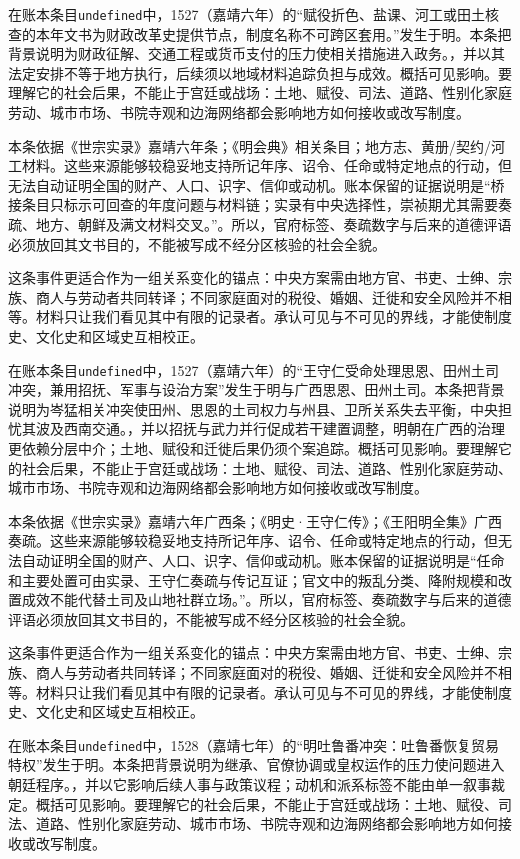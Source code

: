 在账本条目\texttt{undefined}中，1527（嘉靖六年）的“赋役折色、盐课、河工或田土核查的本年文书为财政改革史提供节点，制度名称不可跨区套用。”发生于明。本条把背景说明为财政征解、交通工程或货币支付的压力使相关措施进入政务。，并以其法定安排不等于地方执行，后续须以地域材料追踪负担与成效。概括可见影响。要理解它的社会后果，不能止于宫廷或战场：土地、赋役、司法、道路、性别化家庭劳动、城市市场、书院寺观和边海网络都会影响地方如何接收或改写制度。

本条依据《世宗实录》嘉靖六年条；《明会典》相关条目；地方志、黄册/契约/河工材料。这些来源能够较稳妥地支持所记年序、诏令、任命或特定地点的行动，但无法自动证明全国的财产、人口、识字、信仰或动机。账本保留的证据说明是“桥接条目只标示可回查的年度问题与材料链；实录有中央选择性，崇祯期尤其需要奏疏、地方、朝鲜及满文材料交叉。”。所以，官府标签、奏疏数字与后来的道德评语必须放回其文书目的，不能被写成不经分区核验的社会全貌。

这条事件更适合作为一组关系变化的锚点：中央方案需由地方官、书吏、士绅、宗族、商人与劳动者共同转译；不同家庭面对的税役、婚姻、迁徙和安全风险并不相等。材料只让我们看见其中有限的记录者。承认可见与不可见的界线，才能使制度史、文化史和区域史互相校正。

在账本条目\texttt{undefined}中，1527（嘉靖六年）的“王守仁受命处理思恩、田州土司冲突，兼用招抚、军事与设治方案”发生于明与广西思恩、田州土司。本条把背景说明为岑猛相关冲突使田州、思恩的土司权力与州县、卫所关系失去平衡，中央担忧其波及西南交通。，并以招抚与武力并行促成若干建置调整，明朝在广西的治理更依赖分层中介；土地、赋役和迁徙后果仍须个案追踪。概括可见影响。要理解它的社会后果，不能止于宫廷或战场：土地、赋役、司法、道路、性别化家庭劳动、城市市场、书院寺观和边海网络都会影响地方如何接收或改写制度。

本条依据《世宗实录》嘉靖六年广西条；《明史·王守仁传》；《王阳明全集》广西奏疏。这些来源能够较稳妥地支持所记年序、诏令、任命或特定地点的行动，但无法自动证明全国的财产、人口、识字、信仰或动机。账本保留的证据说明是“任命和主要处置可由实录、王守仁奏疏与传记互证；官文中的叛乱分类、降附规模和改置成效不能代替土司及山地社群立场。”。所以，官府标签、奏疏数字与后来的道德评语必须放回其文书目的，不能被写成不经分区核验的社会全貌。

这条事件更适合作为一组关系变化的锚点：中央方案需由地方官、书吏、士绅、宗族、商人与劳动者共同转译；不同家庭面对的税役、婚姻、迁徙和安全风险并不相等。材料只让我们看见其中有限的记录者。承认可见与不可见的界线，才能使制度史、文化史和区域史互相校正。

在账本条目\texttt{undefined}中，1528（嘉靖七年）的“明吐鲁番冲突：吐鲁番恢复贸易特权”发生于明。本条把背景说明为继承、官僚协调或皇权运作的压力使问题进入朝廷程序。，并以它影响后续人事与政策议程；动机和派系标签不能由单一叙事裁定。概括可见影响。要理解它的社会后果，不能止于宫廷或战场：土地、赋役、司法、道路、性别化家庭劳动、城市市场、书院寺观和边海网络都会影响地方如何接收或改写制度。

